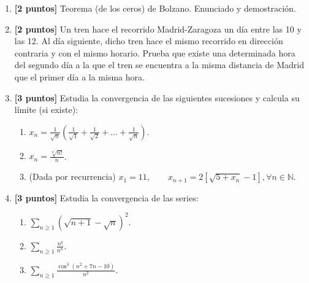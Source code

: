\documentclass[12pt]{article}
\begin{document}
    \begin{enumerate}
        \item \textbf{[2 puntos]} Teorema (de los ceros) de Bolzano. Enunciado y demostración.
    
        \item \textbf{[2 puntos]} Un tren hace el recorrido Madrid-Zaragoza un día entre las 10 y las 12. Al día siguiente, dicho tren hace el mismo recorrido en dirección contraria y con el mismo horario. Prueba que existe una determinada hora del segundo día a la que el tren se encuentra a la misma distancia de Madrid que el primer día a la misma hora.
    
        \item \textbf{[3 puntos]} Estudia la convergencia de las siguientes sucesiones y calcula su límite (si existe):
    
        \begin{enumerate}
            \item \( \displaystyle x_n = \frac{1}{\sqrt{n}}
            \left( \frac{1}{\sqrt{1}} + \frac{1}{\sqrt{2}} + \dots + \frac{1}{\sqrt{n}}  \right)\).
    
            \item $\displaystyle x_n = \frac{\sqrt[n]{n!}}{n}$.
    
            \item (Dada por recurrencia) $\displaystyle x_1 = 11, \qquad x_{n+1} = 2[\sqrt{5+x_n} -1], \forall n\in \mathbb{N}$.
        \end{enumerate}
    
        \item \textbf{[3 puntos]} Estudia la convergencia de las series:
    
        \begin{enumerate}
            \item $ \displaystyle \sum_{n\geq 1} \left( \sqrt{n+1} - \sqrt{n}\right)^2$.
    
            \item $ \displaystyle \sum_{n\geq 1} \frac{n!}{n^n}$.
        
            \item $ \displaystyle \sum_{n\geq 1} \frac{\cos^3 (n^2 + 7n - 10)}{n^2}.
            $
        \end{enumerate}
    
        
    \end{enumerate}
\end{document}

